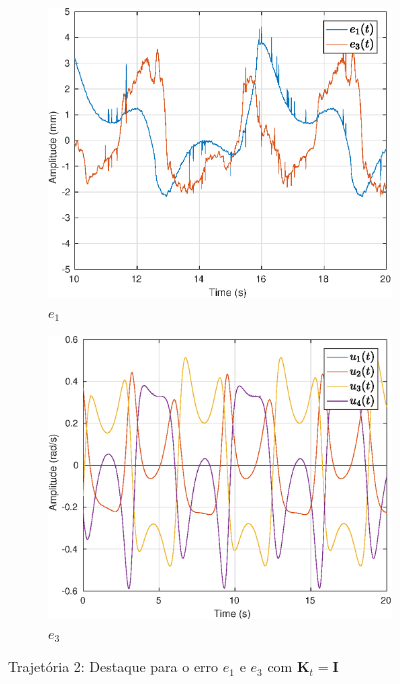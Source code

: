 \begin{figure}[H]
\centering
\begin{subfigure}{.5\textwidth}
  \centering
  \includegraphics[width=\linewidth]{./img/traj_2_k1/error.eps}
  \caption{$e_1$}
  \label{fig:sub1}
\end{subfigure}%
\begin{subfigure}{.5\textwidth}
  \centering
  \includegraphics[width=\linewidth]{./img/traj_2_k1/u.eps}
  \caption{$e_3$}
  \label{fig:sub2}
\end{subfigure}
\caption{Trajetória 2: Destaque para o erro $e_1$ e $e_3$ com $\bm{K}_t = \bm{I}$}
\label{fig:erro_traj}
\end{figure}

